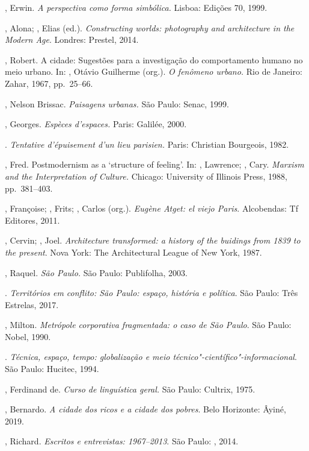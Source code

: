 \begin{bibliohedra}
, Erwin. \emph{A perspectiva como forma simbólica.} Lisboa:
Edições 70, 1999.

, Alona; , Elias (ed.). \emph{Constructing worlds:
photography and architecture in the Modern Age}. Londres: Prestel, 2014.

, Robert. A cidade: Sugestões para a investigação do comportamento
humano no meio urbano. In: , Otávio Guilherme (org.). \emph{O
fenômeno urbano.} Rio de Janeiro: Zahar, 1967, pp.~25--66.

, Nelson Brissac. \emph{Paisagens urbanas.} São Paulo: Senac, 1999.

, Georges. \emph{Espèces d'espaces.} Paris: Galilée, 2000.

\tit{\_\_\_\_\_\_}. \emph{Tentative d'épuisement d'un lieu parisien.}
Paris: Christian Bourgeois, 1982.

, Fred. Postmodernism as a `structure of feeling'. In: ,
Lawrence; , Cary. \emph{Marxism and the Interpretation of
Culture.} Chicago: University of Illinois Press, 1988, pp.~381--403.

, Françoise; , Frits; , Carlos (org.).
\emph{Eugène Atget: el viejo Paris}. Alcobendas: Tf Editores, 2011.

, Cervin; , Joel. \emph{Architecture transformed: a
history of the buidings from 1839 to the present}. Nova York: The
Architectural League of New York, 1987.

, Raquel. \emph{São Paulo.} São Paulo: Publifolha, 2003.

\tit{\_\_\_\_\_\_}. \emph{Territórios em conflito: São Paulo: espaço,
história e política}. São Paulo: Três Estrelas, 2017.

, Milton. \emph{Metrópole corporativa fragmentada: o caso de
São Paulo}. São Paulo: Nobel, 1990.

\tit{\_\_\_\_\_\_}. \emph{Técnica, espaço, tempo: globalização e meio
técnico"-científico"-informacional}. São Paulo: Hucitec, 1994.

, Ferdinand de. \emph{Curso de linguística geral.} São Paulo:
Cultrix, 1975.

, Bernardo. \emph{A cidade dos ricos e a cidade dos pobres}. Belo Horizonte: Âyiné, 2019.

, Richard. \emph{Escritos e entrevistas: 1967--2013}. São Paulo:
, 2014.


\end{bibliohedra}
